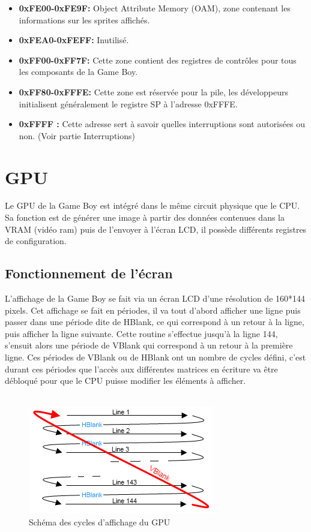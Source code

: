 \documentclass{report}
\begin{document}
\begin{itemize}
\item \textbf{0xFE00-0xFE9F:} Object Attribute Memory (OAM), zone contenant les informations
sur les sprites affichés.
\item \textbf{0xFEA0-0xFEFF:} Inutilisé.
\item \textbf{0xFF00-0xFF7F:} Cette zone contient des registres de contrôles pour tous les composants de la
Game Boy.
\item \textbf{0xFF80-0xFFFE:} Cette zone est réservée pour la pile, les
développeurs initialisent généralement le registre SP à l'adresse 0xFFFE.
\item \textbf{0xFFFF :} Cette adresse sert à savoir quelles interruptions sont autorisées ou
non. (Voir partie Interruptions)
\end{itemize} 


\section{GPU}

Le GPU de la Game Boy est intégré dans le même circuit physique que le CPU. Sa fonction est de générer une image à partir des données contenues dans la VRAM (vidéo ram) puis de l'envoyer à l'écran LCD, il possède différents registres de configuration.

\subsection{Fonctionnement de l'écran}

L'affichage de la Game Boy se fait via un écran LCD d'une résolution de 160*144 pixels. Cet affichage se fait en périodes, il va tout d'abord afficher une ligne puis passer dans une période dite de HBlank, ce qui correspond à un retour à la ligne, puis afficher la ligne suivante. Cette routine s'effectue jusqu'à la ligne 144, s'ensuit alors une période de VBlank qui correspond à un retour à la première ligne.
Ces périodes de VBlank ou de HBlank ont un nombre de cycles défini, c'est
durant ces périodes que l'accès aux différentes matrices en écriture va être
débloqué pour que le CPU puisse modifier les éléments à afficher.\\\\

\begin{figure}[!h]
\centering
\includegraphics[scale=0.8]{images/gpu_cycles.png}
\caption{Schéma des cycles d'affichage du GPU}
\label{gpucycles}
\end{figure}
\end{document}
